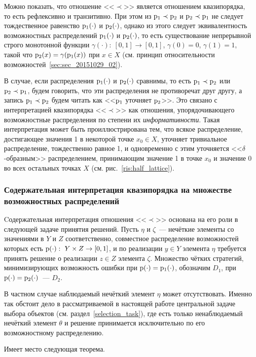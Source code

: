 Можно показать, что отношение <<$\prec$>> является отношением квазипорядка, то есть рефлексивно и транзитивно. При этом из ${\mathrm{p}}_1\prec{\mathrm{p}}_2$ и ${\mathrm{p}}_2\prec{\mathrm{p}}_1$ не следует тождественное равенство ${\mathrm{p}}_1(\cdot)$ и ${\mathrm{p}}_2(\cdot)$, однако из этого следует эквивалентность возможностных распределений ${\mathrm{p}}_1(\cdot)$ и ${\mathrm{p}}_2(\cdot)$, то есть существование непрерывной строго монотонной функции $\gamma (\cdot):\ [0,1]\to[0,1]$, $\gamma(0) = 0$, $\gamma(1) = 1$, такой что ${\mathrm{p}}_2(x) = \gamma({\mathrm{p}}_1(x))$ при $x\in X$ (см. принцип относительности возможностей~\ref{sec:sec_20151029_02}).

В случае, если распределения ${\mathrm{p}}_1(\cdot)$ и ${\mathrm{p}}_2(\cdot)$ сравнимы, то есть ${\mathrm{p}}_1\prec{\mathrm{p}}_2$ или ${\mathrm{p}}_2\prec{\mathrm{p}}_1$, будем говорить, что эти распределения не противоречат друг другу, а запись ${\mathrm{p}}_1\prec{\mathrm{p}}_2$ будем читать как <<${\mathrm{p}}_1$ уточняет ${\mathrm{p}}_2$>>. Это связано с интерпретацией квазипорядка <<$\prec$>> как отношения, упорядочивающего возможностные распределения по степени их \emph{информативности}. Такая интерпретация может быть проиллюстрирована тем, что всякое распределение, достигающее значения 1 в некоторой точке $x_0 \in X$, уточняет тривиальное распределение, тождественно равное 1, и одновременно с этим уточняется <<$\delta$-образным>> распределением, принимающим значение 1 в точке $x_0$ и значение 0 во всех остальных точках $X$ (см. рис.~\ref{ris:half_lattice}).

\subsubsection{Содержательная интерпретация квазипорядка на множестве возможностных распределений}
\label{preorder_explain}

Cодержательная интерпретация отношения <<$\prec$>> основана на его роли в следующей задаче принятия решений.  Пусть $\eta$ и $\zeta$~--- нечёткие элементы со значениями в $Y$ и $Z$ соответственно, совместное распределение возможностей которых есть ${\mathrm{p}}(\cdot):\ Y\times Z\to[0,1]$, и по реализации $y\in Y$ элемента $\eta$ требуется принять решение о реализации $z\in Z$ элемента $\zeta$. Множество чётких стратегий, минимизирующих возможность ошибки при ${\mathrm{p}}(\cdot) = {\mathrm{p}}_1(\cdot)$, обозначим $D_1$, при ${\mathrm{p}}(\cdot) = {\mathrm{p}}_2(\cdot)$~--- $D_2$.
\begin{notice}
В частном случае наблюдаемый нечёткий элемент $\eta$ может отсутствовать. Именно так обстоит дело в рассматриваемой в настоящей работе центральной задаче выбора объектов (см. раздел~\ref{selection_task}), где есть только ненаблюдаемый нечёткий элемент $\theta$ и решение принимается исключительно по его возможностному распределению.
\end{notice}
Имеет место следующая теорема.

